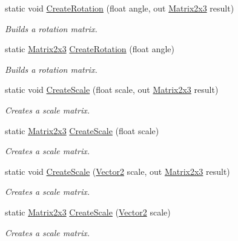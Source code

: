 \begin{DoxyCompactItemize}
\item 
static void \hyperlink{struct_open_t_k_1_1_matrix2x3_aeb28cadc80021a1c1963c4ec1e092330}{Create\-Rotation} (float angle, out \hyperlink{struct_open_t_k_1_1_matrix2x3}{Matrix2x3} result)
\begin{DoxyCompactList}\small\item\em Builds a rotation matrix. \end{DoxyCompactList}\item 
static \hyperlink{struct_open_t_k_1_1_matrix2x3}{Matrix2x3} \hyperlink{struct_open_t_k_1_1_matrix2x3_acd1ea4b6bd3cef61c315ba3b69cd3ecb}{Create\-Rotation} (float angle)
\begin{DoxyCompactList}\small\item\em Builds a rotation matrix. \end{DoxyCompactList}\item 
static void \hyperlink{struct_open_t_k_1_1_matrix2x3_a8fb168e799c59f0adde81f453498b799}{Create\-Scale} (float scale, out \hyperlink{struct_open_t_k_1_1_matrix2x3}{Matrix2x3} result)
\begin{DoxyCompactList}\small\item\em Creates a scale matrix. \end{DoxyCompactList}\item 
static \hyperlink{struct_open_t_k_1_1_matrix2x3}{Matrix2x3} \hyperlink{struct_open_t_k_1_1_matrix2x3_a1558b9dd4dad10e1afdc9e59bd48772d}{Create\-Scale} (float scale)
\begin{DoxyCompactList}\small\item\em Creates a scale matrix. \end{DoxyCompactList}\item 
static void \hyperlink{struct_open_t_k_1_1_matrix2x3_a87a13954ebf52ca155aca9a1dd582729}{Create\-Scale} (\hyperlink{struct_open_t_k_1_1_vector2}{Vector2} scale, out \hyperlink{struct_open_t_k_1_1_matrix2x3}{Matrix2x3} result)
\begin{DoxyCompactList}\small\item\em Creates a scale matrix. \end{DoxyCompactList}\item 
static \hyperlink{struct_open_t_k_1_1_matrix2x3}{Matrix2x3} \hyperlink{struct_open_t_k_1_1_matrix2x3_a76a4670a6cd4eabea8c13415673d5cf1}{Create\-Scale} (\hyperlink{struct_open_t_k_1_1_vector2}{Vector2} scale)
\begin{DoxyCompactList}\small\item\em Creates a scale matrix. \end{DoxyCompactList}\item 

\end{DoxyCompactItemize}
